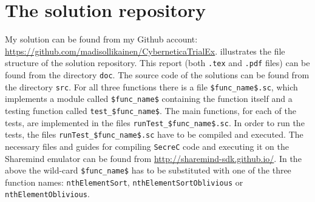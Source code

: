 \documentclass[11pt]{article}
\newcommand{\ct}[1]{\texttt{#1}}
\newcommand{\SC}{\ct{SecreC}\xspace}
\begin{document}


\section{The solution repository} %
\label{sec:the_solution_repository}

My solution can be found from my Github account: \url{https://github.com/madisollikainen/CyberneticaTrialEx}.  illustrates the file structure of the solution repository. This report (both \ct{.tex} and \ct{.pdf} files) can be found from the directory \ct{doc}. The source code of the solutions can be found from the directory \ct{src}. For all three functions there is a file \ct{\$func\_name\$.sc}, which implements a module called \ct{\$func\_name\$} containing the function itself and a testing function called \ct{test\_\$func\_name\$}. The main functions, for each of the tests, are implemented in the files \ct{runTest\_\$func\_name\$.sc}. In order to run the tests, the files \ct{runTest\_\$func\_name\$.sc} have to be compiled and executed. The necessary files and guides for compiling \SC code and executing it on the Sharemind emulator can be found from \url{http://sharemind-sdk.github.io/}. In the above the wild-card \ct{\$func\_name\$} has to be substituted with one of the three function names: \ct{nthElementSort}, \ct{nthElementSortOblivious} or \ct{nthElementOblivious}.


\end{document}
